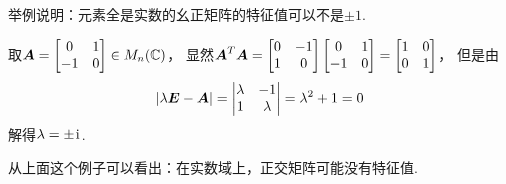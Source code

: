 \begin{example}
举例说明：元素全是实数的幺正矩阵的特征值可以不是\(\pm1\).
\begin{solution}
取\(\boldsymbol{A}
= \begin{bmatrix}
	0 & 1 \\
	-1 & 0
\end{bmatrix} \in M_n(\mathbb{C})\)，
显然\(\boldsymbol{A}^T \boldsymbol{A}
= \begin{bmatrix}
	0 & -1 \\
	1 & 0
\end{bmatrix}
\begin{bmatrix}
	0 & 1 \\
	-1 & 0
\end{bmatrix}
= \begin{bmatrix}
	1 & 0 \\
	0 & 1
\end{bmatrix}\)，
但是由\begin{equation*}
	\abs{\lambda\boldsymbol{E}-\boldsymbol{A}}
	= \begin{vmatrix}
		\lambda & -1 \\
		1 & \lambda
	\end{vmatrix}
	= \lambda^2 + 1
	= 0
\end{equation*}解得\(\lambda=\pm\kern1pt\mathrm{i}\kern1pt\).
\end{solution}
\end{example}
\begin{remark}
从上面这个例子可以看出：在实数域上，正交矩阵可能没有特征值.
\end{remark}
